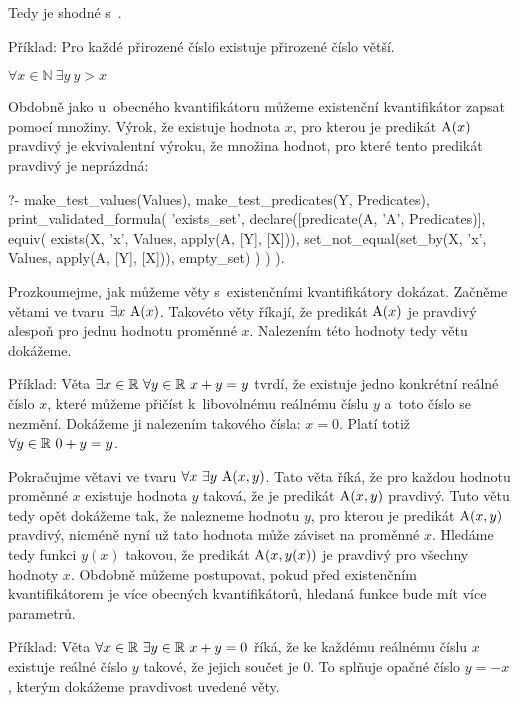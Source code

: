 Tedy  je shodné s~.

Příklad: Pro každé přirozené číslo existuje přirozené číslo větší. 

\(\forall x \in \mathbb{N} \ \exists y \ y > x\)

Obdobně jako u~obecného kvantifikátoru můžeme existenční kvantifikátor zapsat pomocí množiny. Výrok, že existuje hodnota \(x\), pro kterou je predikát \(\mathrm{A}(x)\) pravdivý je ekvivalentní výroku, že množina hodnot, pro které tento predikát pravdivý je neprázdná:

\begin{prolog}
?- 	make_test_values(Values),
	make_test_predicates(Y, Predicates),
	print_validated_formula(
		'exists_set',
		declare([predicate(A, 'A', Predicates)],
			equiv(
				exists(X, 'x', Values, apply(A, [Y], [X])),
				set_not_equal(set_by(X, 'x', Values, apply(A, [Y], [X])), empty_set)
			)
		)
	).
\end{prolog}

Prozkoumejme, jak můžeme věty s~existenčními kvantifikátory dokázat. Začněme větami ve tvaru \(\exists x \ \predicate{A}(x)\). Takovéto věty říkají, že predikát \(\mathrm{A}(x)\) je pravdivý alespoň pro jednu hodnotu proměnné \(x\).  Nalezením této hodnoty tedy větu dokážeme.

Příklad: Věta \(\exists x \in \real \ \forall y \in \real \ x + y = y\) tvrdí, že existuje jedno konkrétní reálné číslo \(x\), které můžeme přičíst k~libovolnému reálnému číslu \(y\) a~toto číslo se nezmění. Dokážeme ji nalezením takového čísla: \(x = 0\). Platí totiž \(\forall y \in \mathbb{R} \ 0 + y = y\).

Pokračujme větavi ve tvaru \(\forall x \ \exists y \ \predicate{A}(x, y)\). Tato věta říká, že pro každou hodnotu proměnné \(x\) existuje hodnota \(y\) taková, že je predikát \(\mathrm{A}(x, y)\) pravdivý. Tuto větu tedy opět dokážeme tak, že nalezneme hodnotu \(y\), pro kterou je predikát \(\mathrm{A}(x, y)\) pravdivý, nicméně nyní už tato hodnota může záviset na proměnné \(x\). Hledáme tedy funkci \(y(x)\) takovou, že predikát \(\mathrm{A}(x, y(x))\) je pravdivý pro všechny hodnoty \(x\). Obdobně můžeme postupovat, pokud před existenčním kvantifikátorem je více obecných kvantifikátorů, hledaná funkce bude mít více parametrů.

Příklad: Věta \(\forall x \in \real \ \exists y \in \real \ x + y = 0\) říká, že ke každému reálnému číslu \(x\) existuje reálné číslo \(y\) takové, že jejich součet je 0. To splňuje opačné číslo \(y = -x\), kterým dokážeme pravdivost uvedené věty.

